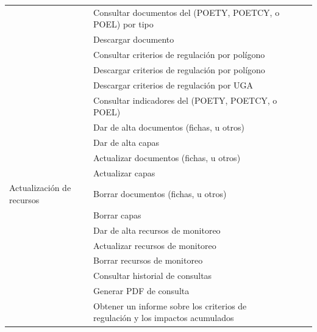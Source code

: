 \begin{longtable}{p{4cm} p{7cm} p{.5cm} p{.5cm} p{.5cm}}
 & Consultar documentos del (POETY, POETCY, o POEL) por tipo &\cellcolor{myotroazul} &\cellcolor{myotroazul} &\cellcolor{myotroazul} \\

 & Descargar documento &\cellcolor{myotroazul} &\cellcolor{myotroazul} &\cellcolor{myotroazul} \\

 & Consultar criterios de regulación por polígono &\cellcolor{myotroazul} &\cellcolor{myotroazul} &\cellcolor{myotroazul} \\

 & Descargar criterios de regulación por polígono &\cellcolor{myotroazul} &\cellcolor{myotroazul} &\cellcolor{myotroazul} \\

 & Descargar criterios de regulación por UGA & \cellcolor{myotroazul}&\cellcolor{myotroazul} &\cellcolor{myotroazul} \\

 & Consultar indicadores del (POETY, POETCY, o POEL) &\cellcolor{myotroazul} &\cellcolor{myotroazul} & \cellcolor{myotroazul}  \\
\hline

 & Dar de alta documentos (fichas, u otros) &\cellcolor{myotroazul}  & &\cellcolor{myotroazul} \\

 & Dar de alta capas & \cellcolor{myotroazul} & &\cellcolor{myotroazul} \\

 & Actualizar documentos (fichas, u otros) &\cellcolor{myotroazul}  & &\cellcolor{myotroazul} \\

& Actualizar capas &\cellcolor{myotroazul} & & \cellcolor{myotroazul}\\

Actualización de recursos & Borrar documentos (fichas, u otros) &\cellcolor{myotroazul} & &\cellcolor{myotroazul} \\

 & Borrar capas &\cellcolor{myotroazul} & & \cellcolor{myotroazul}\\

 & Dar de alta recursos de monitoreo &\cellcolor{myotroazul} & &\cellcolor{myotroazul} \\

 & Actualizar recursos de monitoreo &\cellcolor{myotroazul} & & \cellcolor{myotroazul}\\

 & Borrar recursos de monitoreo &\cellcolor{myotroazul} & & \cellcolor{myotroazul}\\
 & Consultar historial de consultas &\cellcolor{myotroazul}  &  &\cellcolor{myotroazul} \\
 & Generar PDF de consulta & \cellcolor{myotroazul} &  & \cellcolor{myotroazul}\\
\hline
 &
Obtener un informe sobre los criterios de regulación y los impactos acumulados & \cellcolor{myotroazul}& & \cellcolor{myotroazul}\\


\end{longtable}
